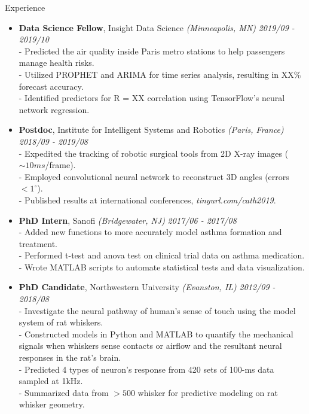 \documentclass{resume} %
\begin{document}

\begin{rSection}{Experience}
	
	\begin{itemize}
	\item {\bf Data Science Fellow}{, Insight Data Science \textit{(Minneapolis, MN)}} \hfill {\em 2019/09 - 2019/10}\\
	- Predicted the air quality inside Paris metro stations to help passengers manage health risks.\\
	- Utilized PROPHET and ARIMA for time series analysis, resulting in XX\% forecast accuracy.\\
	- Identified predictors for R = XX correlation using TensorFlow's neural network regression.
	
	
	\item {\bf Postdoc}{, Institute for Intelligent Systems and Robotics \textit{(Paris, France)}} \hfill {\em 2018/09 - 2019/08}\\
	- Expedited the tracking of robotic surgical tools from 2D X-ray images ($\sim 10 ms$/frame).\\ 
	- Employed convolutional neural network to reconstruct 3D angles (errors $< 1 ^\circ$).\\
	- Published results at international conferences, \textit{tinyurl.com/cath2019}.
	
	
	
	\item {\bf PhD Intern}{, Sanofi \textit{(Bridgewater, NJ)}} \hfill {\em 2017/06 - 2017/08}\\
	- Added new functions to more accurately model asthma formation and treatment.\\
	- Performed t-test and anova test on clinical trial data on asthma medication.\\ 
	- Wrote MATLAB scripts to automate statistical tests and data visualization.
	

	\item {\bf PhD Candidate}{, Northwestern University \textit{(Evanston, IL)}} \hfill {\em 2012/09 - 2018/08}\\
	- Investigate the neural pathway of human's sense of touch using the model system of rat whiskers.\\
	- Constructed models in Python and MATLAB to quantify the mechanical signals when whiskers sense contacts or airflow and the resultant neural responses in the rat's brain.\\
	- Predicted 4 types of neuron’s response from 420 sets of 100-ms data sampled at 1kHz.\\
	- Summarized data from $>500$ whisker for predictive modeling on rat whisker geometry. 
	

\end{itemize}
\end{rSection}
\end{document}
